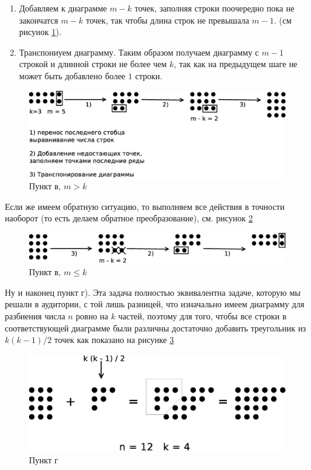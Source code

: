 \documentclass[a4paper,12pt]{article}
\begin{document}
\begin{Solution}
\begin{enumerate}
\item Добавляем к диаграмме $m-k$ точек, заполняя строки поочередно пока не закончатся $m-k$ точек, так чтобы длина строк не превышала $m-1$. (см рисунок \ref{img::ferre3}).

\item Транспониуем диаграмму. Таким образом получаем диаграмму с $m-1$ строкой и длинной строки не более чем $k$, так как на предыдущем шаге не может быть добавлено более $1$ строки.
\end{enumerate}

\begin{figure}[h]
\begin{center}
\noindent\includegraphics[width=0.4\linewidth]{ferre3}
\end{center}
\caption{Пункт в, $m>k$}
\label{img::ferre3}
\end{figure}

Если же имеем обратную ситуацию, то выполняем все действия в точности наоборот (то есть делаем обратное преобразование), см. рисунок \ref{img::ferre4}

\begin{figure}[h]
\begin{center}
\noindent\includegraphics[width=0.4\linewidth]{ferre4}
\end{center}
\caption{Пункт в, $m\le k$}
\label{img::ferre4}
\end{figure}

Ну и наконец пункт г). Эта задача полностью эквивалентна задаче, которую мы решали в аудитории, с той лишь разницей, что изначально имеем диаграмму для разбиения числа $n$ ровно на $k$ частей, поэтому для того, чтобы все строки в соответствующей диаграмме были различны достаточно добавить треугольник из ${k \left(k-1\right)}/2$ точек как показано на рисунке \ref{img::ferre5}

\begin{figure}[h]
\begin{center}
\noindent\includegraphics[width=0.4\linewidth]{ferre5}
\end{center}
\caption{Пункт г}
\label{img::ferre5}
\end{figure}

\end{Solution}
\end{document}

